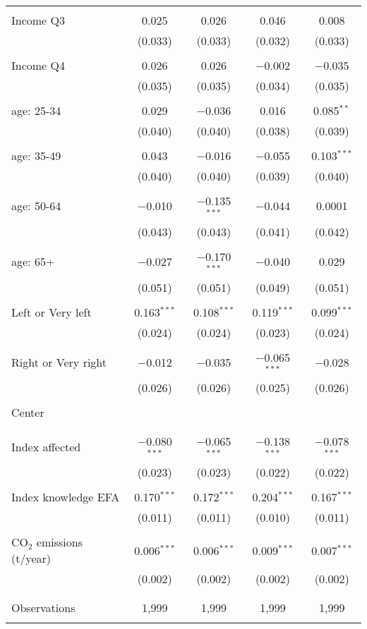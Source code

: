 \begin{tabular}{@{\extracolsep{5pt}}lcccc}
  & & & & \\ 
 Income Q3 & 0.025 & 0.026 & 0.046 & 0.008 \\ 
  & (0.033) & (0.033) & (0.032) & (0.033) \\ 
  & & & & \\ 
 Income Q4 & 0.026 & 0.026 & $-$0.002 & $-$0.035 \\ 
  & (0.035) & (0.035) & (0.034) & (0.035) \\ 
  & & & & \\ 
 age: 25-34 & 0.029 & $-$0.036 & 0.016 & 0.085$^{**}$ \\ 
  & (0.040) & (0.040) & (0.038) & (0.039) \\ 
  & & & & \\ 
 age: 35-49 & 0.043 & $-$0.016 & $-$0.055 & 0.103$^{***}$ \\ 
  & (0.040) & (0.040) & (0.039) & (0.040) \\ 
  & & & & \\ 
 age: 50-64 & $-$0.010 & $-$0.135$^{***}$ & $-$0.044 & 0.0001 \\ 
  & (0.043) & (0.043) & (0.041) & (0.042) \\ 
  & & & & \\ 
 age: 65+ & $-$0.027 & $-$0.170$^{***}$ & $-$0.040 & 0.029 \\ 
  & (0.051) & (0.051) & (0.049) & (0.051) \\ 
  & & & & \\ 
 Left or Very left & 0.163$^{***}$ & 0.108$^{***}$ & 0.119$^{***}$ & 0.099$^{***}$ \\ 
  & (0.024) & (0.024) & (0.023) & (0.024) \\ 
  & & & & \\ 
 Right or Very right & $-$0.012 & $-$0.035 & $-$0.065$^{***}$ & $-$0.028 \\ 
  & (0.026) & (0.026) & (0.025) & (0.026) \\ 
  & & & & \\ 
 Center &  &  &  &  \\ 
  &  &  &  &  \\ 
  & & & & \\ 
 Index affected & $-$0.080$^{***}$ & $-$0.065$^{***}$ & $-$0.138$^{***}$ & $-$0.078$^{***}$ \\ 
  & (0.023) & (0.023) & (0.022) & (0.022) \\ 
  & & & & \\ 
 Index knowledge EFA & 0.170$^{***}$ & 0.172$^{***}$ & 0.204$^{***}$ & 0.167$^{***}$ \\ 
  & (0.011) & (0.011) & (0.010) & (0.011) \\ 
  & & & & \\ 
 CO$_{2}$ emissions (t/year) & 0.006$^{***}$ & 0.006$^{***}$ & 0.009$^{***}$ & 0.007$^{***}$ \\ 
  & (0.002) & (0.002) & (0.002) & (0.002) \\ 
  & & & & \\ 
\hline \\[-1.8ex] 

Observations & 1,999 & 1,999 & 1,999 & 1,999 \\ 
\hline 
\hline \\[-1.8ex] 
\end{tabular} 